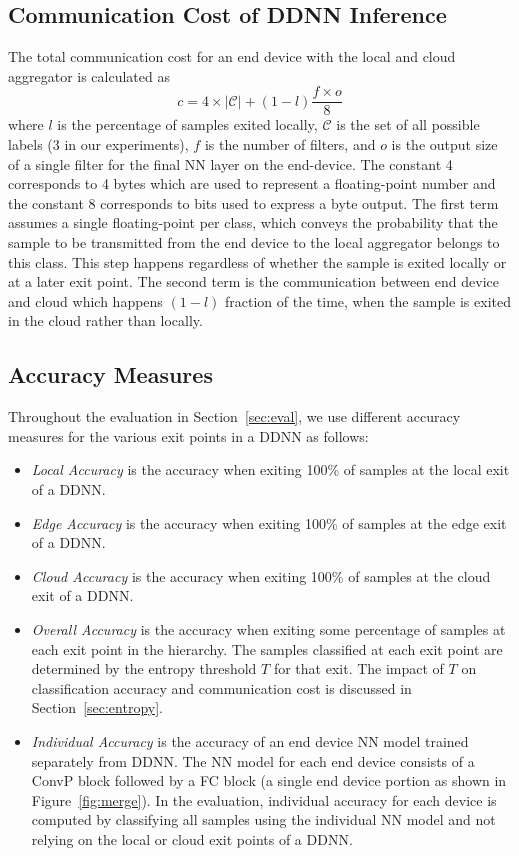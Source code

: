 \documentclass[10pt, conference, compsocconf]{IEEEtran}
\begin{document}
\subsection{Communication Cost of DDNN Inference}
\label{sec:ddnn-comm}
The total communication cost for an end device with the local and cloud aggregator is calculated as 
\begin{equation}
\label{eq:comm}
c = 4\times |\mathcal{C}| + (1-l)\frac{f\times o}{8}    
\end{equation}
where $l$ is the percentage of samples exited locally, $\mathcal{C}$ is the set of all possible labels (3 in our experiments), $f$ is the number of filters, and $o$ is the output size of a single filter for the final NN layer on the end-device. The constant 4 corresponds to 4 bytes which are used to represent a floating-point number and the constant 8 corresponds to bits used to express a byte output. The first term assumes a single floating-point per class, which conveys the probability that the sample to be transmitted from the end device to the local aggregator belongs to this class. This step happens regardless of whether the sample is exited locally or at a later exit point. The second term is the communication between end device and cloud which happens $(1-l)$ fraction of the time, when the sample is exited in the cloud rather than locally.

\subsection{Accuracy Measures}
\label{sec:acc-def}
Throughout the evaluation in Section~\ref{sec:eval}, we use different accuracy measures for the various exit points in a DDNN as follows:
\begin{itemize}
    \item \textit{Local Accuracy} is the accuracy when exiting 100\% of samples at the local exit of a DDNN.
    \item \textit{Edge Accuracy} is the accuracy when exiting 100\% of samples at the edge exit of a DDNN.
    \item \textit{Cloud Accuracy} is the accuracy when exiting 100\% of samples at the cloud exit of a DDNN.
    \item \textit{Overall Accuracy} is the accuracy when exiting some percentage of samples at each exit point in the hierarchy. The samples classified at each exit point are determined by the entropy threshold $T$ for that exit. The impact of $T$ on classification accuracy and communication cost is discussed in Section~\ref{sec:entropy}.
    \item \textit{Individual Accuracy} is the accuracy of an end device NN model trained separately from DDNN. The NN model for each end device consists of a ConvP block followed by a FC block (a single end device portion as shown in Figure~\ref{fig:merge}). In the evaluation, individual accuracy for each device is computed by classifying all samples using the individual NN model and not relying on the local or cloud exit points of a DDNN.
\end{itemize}
\end{document}
